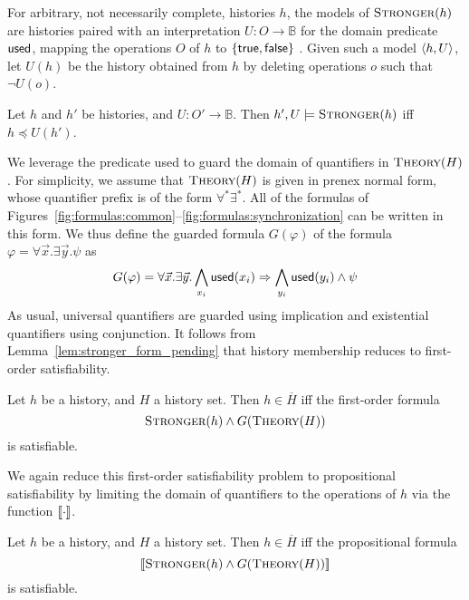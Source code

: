 For arbitrary, not necessarily complete, histories $h$, the models of
$\textsc{Stronger}(h)$ are histories paired with an interpretation $U : O \to
\mathbb{B}$ for the domain predicate ${\sf used}$, mapping the operations $O$ of
$h$ to $\set{\sf true, false}$ . Given such a model $\tup{h,U}$, let $U(h)$ be
the history obtained from $h$ by deleting operations $o$ such that $\lnot U(o)$.

\begin{lemma}
  \label{lem:stronger_form_pending}

  Let $h$ and $h'$ be histories, and $U : O' \to \mathbb{B}$.
  Then $h', U \models \textsc{Stronger}(h)$ if{f} $h \preceq U(h')$.

\end{lemma}

We leverage the predicate {\sf used} to guard the domain of quantifiers in
$\textsc{Theory}(H)$. For simplicity, we assume that $\textsc{Theory}(H)$ is
given in prenex normal form, whose quantifier prefix is of the form $\forall^*
\exists^*$. All of the formulas of
Figures~\ref{fig:formulas:common}--\ref{fig:formulas:synchronization} can be
written in this form. We thus define the guarded formula $G(\varphi)$ of the formula
$\varphi = \forall \vec{x}. \exists \vec{y}. \psi$ as
\begin{align*}
  G(\varphi) = \forall \vec{x}. \exists \vec{y}.
  \bigwedge_{x_i} {\sf used}(x_i) \implies 
  \bigwedge_{y_i} {\sf used}(y_i) \land \psi
\end{align*}
As usual, universal quantifiers are guarded using implication and existential
quantifiers using conjunction. It follows from
Lemma~\ref{lem:stronger_form_pending} that history membership reduces to
first-order satisfiability.

\begin{theorem}
  \label{th:satisfiability_complete}

  Let $h$ be a history, and $H$ a history set. Then $h \in \overline{H}$ if{f}
  the first-order formula
  $$\textsc{Stronger}(h) \land G(\textsc{Theory}(H))$$
  is satisfiable.

\end{theorem}

We again reduce this first-order satisfiability problem to propositional
satisfiability by limiting the domain of quantifiers to the operations of $h$
via the function $\db{\cdot}$.

\begin{corollary}
  \label{cor:satisfiability_pending}

  Let $h$ be a history, and $H$ a history set. Then $h \in \overline{H}$ if{f}
  the propositional formula
  $$\db{\textsc{Stronger}(h) \land G(\textsc{Theory}(H))}$$
  is satisfiable.

\end{corollary}
